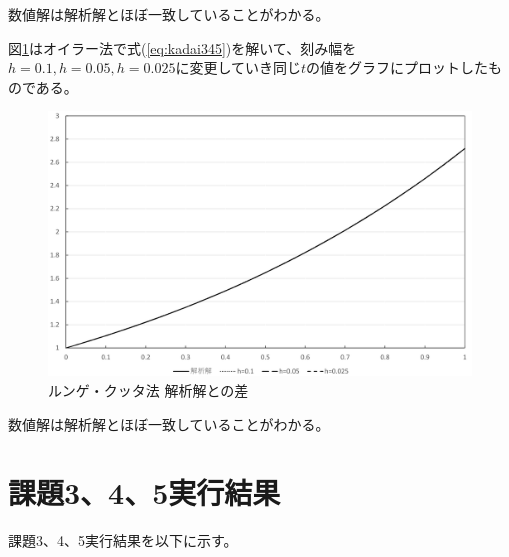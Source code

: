 \documentclass[10pt,titlepage]{jsarticle}
\begin{document}
数値解は解析解とほぼ一致していることがわかる。


図\ref{fig:kadai5}はオイラー法で式(\ref{eq:kadai345})を解いて、刻み幅を$h=0.1,h=0.05,h=0.025$に変更していき同じ$t$の値をグラフにプロットしたものである。

\begin{figure}[H]
\centering
\includegraphics[width=12cm]{img/kadai5.png}
\caption{ルンゲ・クッタ法  解析解との差}
\label{fig:kadai5}
\end{figure}

数値解は解析解とほぼ一致していることがわかる。

\appendix
\section{課題3、4、5実行結果}
\label{kadai345}
課題3、4、5実行結果を以下に示す。

\begin{oframed}
\end{oframed}
\end{document}
